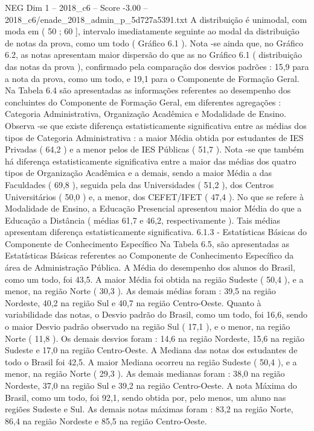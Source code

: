 \begin{textsample}{NEG Dim 1 – 2018\_c6 – Score -3.00 – 2018\_c6/enade\_2018\_admin\_p\_5d727a5391.txt}
A distribuição é unimodal, com moda em ( 50 ; 60 ], intervalo imediatamente seguinte ao modal da distribuição de notas da prova, como um todo ( Gráfico 6.1 ).
Nota -se ainda que, no Gráfico 6.2, as notas apresentam maior dispersão do que as no Gráfico 6.1 ( distribuição das notas da prova ), confirmado pela comparação dos desvios padrões : 15,9 para a nota da prova, como um todo, e 19,1 para o Componente de Formação Geral.
Na Tabela 6.4 são apresentadas as informações referentes ao desempenho dos concluintes do Componente de Formação Geral, em diferentes agregações : Categoria Administrativa, Organização Acadêmica e Modalidade de Ensino.
Observa -se que existe diferença estatisticamente significativa entre as médias dos tipos de Categoria Administrativa : a maior Média obtida por estudantes de IES Privadas ( 64,2 ) e a menor pelos de IES Públicas ( 51,7 ).
Nota -se que também há diferença estatisticamente significativa entre a maior das médias dos quatro tipos de Organização Acadêmica e a demais, sendo a maior Média a das Faculdades ( 69,8 ), seguida pela das Universidades ( 51,2 ), dos Centros Universitários ( 50,0 ) e, a menor, dos CEFET/IFET ( 47,4 ).
No que se refere à Modalidade de Ensino, a Educação Presencial apresentou maior Média do que a Educação a Distância ( médias 61,7 e 46,2, respectivamente ).
Tais médias apresentam diferença estatisticamente significativa. 6.1.3 - Estatísticas Básicas do Componente de Conhecimento Específico Na Tabela 6.5, são apresentadas as Estatísticas Básicas referentes ao Componente de Conhecimento Específico da área de Administração Pública.
A Média do desempenho dos alunos do Brasil, como um todo, foi 43,5.
A maior Média foi obtida na região Sudeste ( 50,4 ), e a menor, na região Norte ( 30,3 ).
As demais médias foram : 39,5 na região Nordeste, 40,2 na região Sul e 40,7 na região Centro-Oeste.
Quanto à variabilidade das notas, o Desvio padrão do Brasil, como um todo, foi 16,6, sendo o maior Desvio padrão observado na região Sul ( 17,1 ), e o menor, na região Norte ( 11,8 ).
Os demais desvios foram : 14,6 na região Nordeste, 15,6 na região Sudeste e 17,0 na região Centro-Oeste.
A Mediana das notas dos estudantes de todo o Brasil foi 42,5.
A maior Mediana ocorreu na região Sudeste ( 50,4 ), e a menor, na região Norte ( 29,3 ).
As demais medianas foram : 38,0 na região Nordeste, 37,0 na região Sul e 39,2 na região Centro-Oeste.
A nota Máxima do Brasil, como um todo, foi 92,1, sendo obtida por, pelo menos, um aluno nas regiões Sudeste e Sul.
As demais notas máximas foram : 83,2 na região Norte, 86,4 na região Nordeste e 85,5 na região Centro-Oeste.

\end{textsample}
